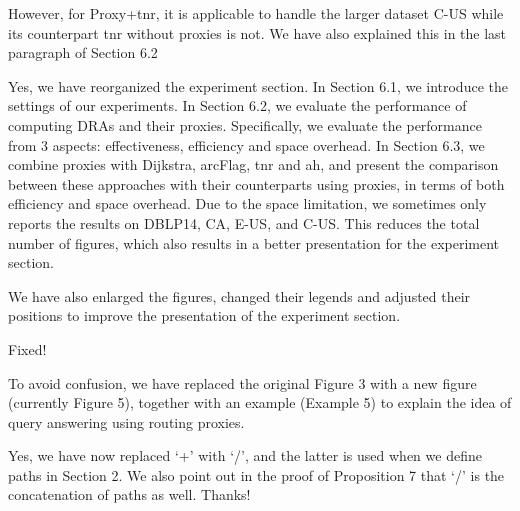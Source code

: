 \documentclass[11pt]{letter}
\newcommand{\svs}{\vspace{0.36ex}}
\newcommand{\ah}{{\sc ah}\xspace}
\newcommand{\arcflag}{{\sc arcFlag}\xspace}
\newcommand{\tnr}{{\sc tnr}\xspace}
\begin{document}
However, for Proxy+\tnr, it is applicable to handle the larger dataset C-US while its counterpart \tnr without proxies is not. We have also explained this in the last paragraph of Section 6.2




\svs

Yes, we have reorganized the experiment section. In Section 6.1, we introduce the settings of our experiments. In Section 6.2, we evaluate the performance of computing DRAs and their proxies. Specifically, we evaluate the performance from 3 aspects: effectiveness, efficiency and space overhead. In Section 6.3, we combine proxies with Dijkstra, \arcflag, \tnr and \ah, and present the comparison between these approaches with their counterparts using proxies, in terms of both efficiency and space overhead.  Due to the space limitation, we sometimes only reports the results on DBLP14, CA, E-US, and C-US. This reduces the total number of figures, which also results in a better presentation for the  experiment section.

We have also enlarged the figures, changed their legends and adjusted their positions to improve the presentation of the experiment section.


\svs
Fixed!


\svs
To avoid confusion, we have replaced the original Figure 3 with a new figure (currently Figure 5), together with an example (Example 5) to explain the idea of query answering using routing proxies.


\svs
Yes, we have now replaced `+' with `/', and the latter is used when we define paths in Section 2.
We also point out in the proof of Proposition 7 that `/' is the concatenation of paths as well.
%
Thanks!

\end{document}
